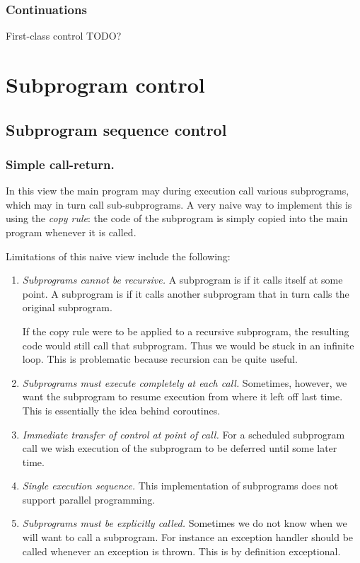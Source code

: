 \subsubsection{Continuations}
First-class control
TODO?

\section{Subprogram control}
\subsection{Subprogram sequence control}
\subsubsection{Simple call-return.} In this view the main program may during execution call various subprograms, which may in turn call sub-subprograms. A very naive way to implement this is using the \textit{copy rule}: the code of the subprogram is simply copied into the main program whenever it is called.

Limitations of this naive view include the following:
\begin{enumerate}
\item \textit{Subprograms cannot be recursive.} A subprogram is  if it calls itself at some point. A subprogram is 	if it calls another subprogram that in turn calls the original subprogram.

If the copy rule were to be applied to a recursive subprogram, the resulting code would still call that subprogram. Thus we would be stuck in an infinite loop. This is problematic because recursion can be quite useful.

\item \textit{Subprograms must execute completely at each call.} Sometimes, however, we want the subprogram to resume execution from where it left off last time. This is essentially the idea behind coroutines.

\item \textit{Immediate transfer of control at point of call.} For a scheduled subprogram call we wish execution of the subprogram to be deferred until some later time.

\item \textit{Single execution sequence.} This implementation of subprograms does not support parallel programming.

\item \textit{Subprograms must be explicitly called.} Sometimes we do not know when we will want to call a subprogram. For instance an exception handler should be called whenever an exception is thrown. This is by definition exceptional.
\end{enumerate}

